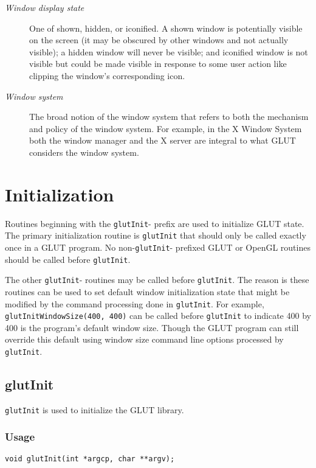 \begin{description}
\item[\em Window display state]  One of shown, hidden, or iconified.
A shown window is potentially visible on the screen (it may be obscured
by other windows and not actually visible); a hidden window will
never be visible; and iconified window is not visible but could
be made visible in response to some user action like clipping the
window's corresponding icon.
\item[\em Window system]  The broad notion of the window system
that refers to both the mechanism and policy of the window system.
For example, in the X Window System both the window manager and the
X server are integral to what GLUT considers the window system.
\end{description}

\section{Initialization}

Routines beginning with the {\tt glutInit}- prefix are used to initialize
GLUT state.  The primary initialization routine is {\tt glutInit} that
should only be called exactly once in a GLUT program.  No non-{\tt glutInit}- prefixed
GLUT or OpenGL routines should be called before {\tt glutInit}.

The other {\tt glutInit}- routines may be called before {\tt glutInit}.
The reason is these routines can be used to set default window initialization
state that might be modified by the command processing done in {\tt glutInit}.
For example, {\tt glutInitWindowSize(400, 400)} can be called before {\tt glutInit}
to indicate 400 by 400 is the program's default window size.  Though the GLUT
program can
still override this default using window size command line options processed by
{\tt glutInit}.

\subsection{glutInit}

{\tt glutInit} is used to initialize the GLUT library.

\subsubsection*{Usage}

\begin{verbatim}
void glutInit(int *argcp, char **argv);
\end{verbatim}

